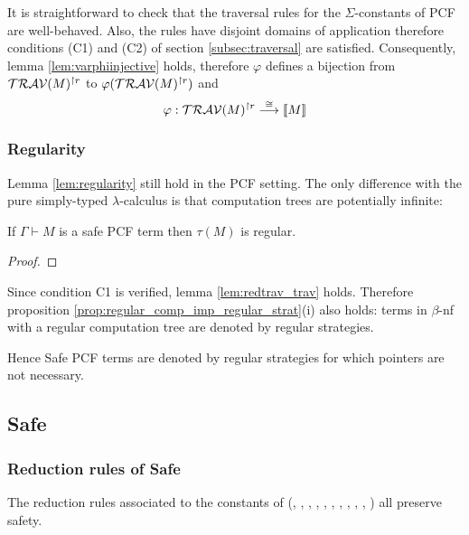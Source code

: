 It is straightforward to check that the traversal rules for the $\Sigma$-constants of PCF are well-behaved. Also, the rules
have disjoint domains of application therefore conditions (C1) and (C2) of section \ref{subsec:traversal} are satisfied.
Consequently, lemma \ref{lem:varphiinjective} holds, therefore
$\varphi$ defines a bijection from $\mathcal{TRAV}(M)^{\upharpoonright r}$  to $\varphi(\mathcal{TRAV}(M)^{\upharpoonright r})$ and
$$\varphi : \mathcal{TRAV}(M)^{\upharpoonright r} \stackrel{\cong}{\longrightarrow} {[\![ M ]\!]} $$


\subsubsection{Regularity}

Lemma \ref{lem:regularity} still hold in the PCF setting. The only difference with the pure
simply-typed $\lambda$-calculus is that computation trees are potentially infinite:
\begin{lem}
If $\Gamma \vdash M$ is a safe PCF term then $\tau(M)$ is regular.
\end{lem}
\begin{proof}

\end{proof}



Since condition C1 is verified, lemma \ref{lem:redtrav_trav} holds. Therefore
proposition \ref{prop:regular_comp_imp_regular_strat}(i) also holds: terms in $\beta$-nf
with a regular computation tree are denoted by regular strategies.

Hence Safe PCF terms are denoted by regular strategies for which pointers are not necessary.


\subsection{Safe \ialgol}

\subsubsection{Reduction rules of Safe \ialgol}
The reduction rules associated to the constants of \ialgol (\iaseq, \iaskip, \iaderef, \iaassign, \iadone, \iarun, \iawrite, \iaread, \iaok, \iamkvar, \ianew) all preserve safety.


